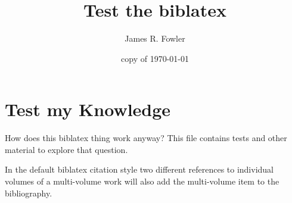 \documentclass{article}
\begin{document}
\title{Test the biblatex}
\author{James R. Fowler}
\date{copy of \today}
\maketitle

\section{Test my Knowledge}

How does this biblatex thing work anyway? This file contains
tests and other material to explore that question.

In the default biblatex citation style two different references
to individual volumes of a multi-volume work will also add
the multi-volume item to the bibliography.


\nocite{Tebbel1972}
\nocite{Tebbel1978}

\vfil\eject

\printbibliography
\end{document}
